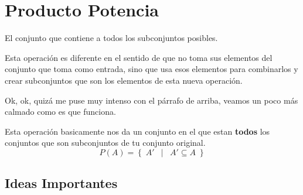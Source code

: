 \documentclass[12pt, fleqn]{report}                             %
\DeclareMathOperator \Space     {\quad}                         %
\DeclareMathOperator \MiniSpace {\;}                            %
\newcommand \Such           {\MiniSpace | \MiniSpace}           %
\theoremstyle{break}                                            %
\newcommand{\Set}[1]            {\left\{ \; #1 \; \right\}}     %
\begin{document}
        \clearpage
        \section{Producto Potencia}

            El conjunto que contiene a todos los subconjuntos posibles. 

            Esta operación es diferente en el sentido de que no toma sus elementos del conjunto
            que toma como entrada, sino que usa esos elementos para combinarlos y crear subconjuntos
            que son los elementos de esta nueva operación.

            Ok, ok, quizá me puse muy intenso con el párrafo de arriba, veamos un poco más calmado
            como es que funciona.

            Esta operación basicamente nos da un conjunto en el que estan \textbf{todos} los
            conjuntos que son subconjuntos de tu conjunto original.
            \begin{equation*}
                P(A) = \Set{ A' \Such A' \subseteq A}
            \end{equation*}


            \clearpage
            \subsection{Ideas Importantes}
\end{document}
